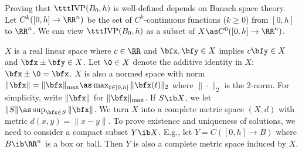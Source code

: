 	Proving that $\ivp(B_0,h)$ is well-defined
	depends on Banach space theory.
	Let $C^k([0, h] \to \RR^n)$ be
	the set of $C^k$-continuous functions ($k \geq 0$)
	from $[0, h]$ to $\RR^n$.
	We can view $\ivp(B_0, h)$ as
	a subset of $X \as C^0([0, h] \to \RR^n)$.
	
		$X$ is a real linear space where
		$c\in\RR$ and $\bfx,\bfy\in X$ implies
		$c\bfy\in X$ and
		$\bfx\pm \bfy\in X$.
		Let $\0\in X$ denote the additive identity
		in $X$: $\bfx\pm \0=\bfx$.
		$X$ is also a normed space with norm 
			$\|\bfx\|=\|\bfx\|_{\max} \as
			\max_{t\in [0,h]} \|\bfx(t)\|_{2}$
		where $\|\cdot\|_{2}$ is the $2$-norm.
		For simplicity, write $\|\bfx\|$ for $\|\bfx\|_{\max}$.
		If $S\ib X$, we let
			$\|S\|\as \sup_{\bfx\in S}\|\bfx\|$.
		We turn $X$ into a complete metric space $(X,d)$
		with metric $d(x,y)= \|x-y\|$.
		To prove existence and uniqueness of solutions, we need
		to consider a compact subset $Y\ib X$.
		E.g., let $Y= C([0,h]\to B)$
		where $B\ib \RR^n$ is a box or ball.
		Then $Y$ is also a complete metric space induced by $X$.

